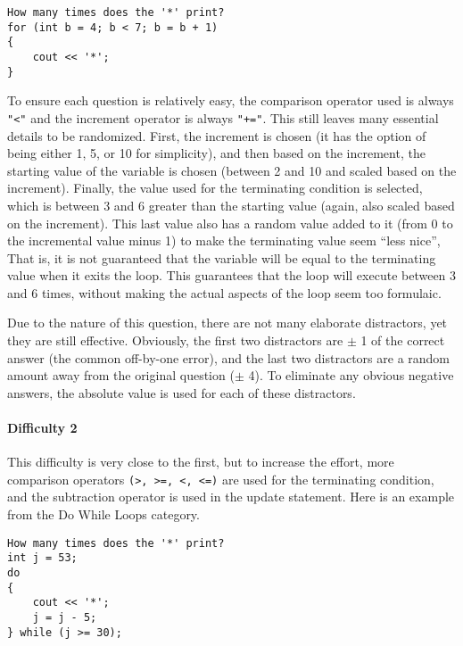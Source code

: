 \documentclass{article}
\begin{document}
\begin{lstlisting}
How many times does the '*' print? 
for (int b = 4; b < 7; b = b + 1)
{
	cout << '*';
} 
\end{lstlisting}

To ensure each question is relatively easy, the comparison operator used is always \verb;"<"; and the increment operator is always \verb;"+=";. This still leaves many essential details to be 
randomized. First, the increment is chosen (it has the option of being either 1, 5, or 10 for simplicity), and then based on the increment, the starting value of the variable is chosen (between 2 and 10 and scaled based on the increment). Finally, the value used for the terminating condition is selected, which is between 3 and 6 greater than the starting value (again, also scaled based 
on the increment). This last value also has a random value added to it (from 0 to the incremental value minus 1) to make the terminating value seem ``less nice'', That is, it is not guaranteed
that the variable will be equal to the terminating value when it exits the loop. This guarantees that the loop will execute between 3 and 6 times, without making the actual aspects of the loop 
seem too formulaic. 

Due to the nature of this question, there are not many elaborate distractors, yet they are still effective. Obviously, the first two distractors are $\pm$ 1 of the correct answer (the common 
off-by-one error), and the last two distractors are a random amount away from the original question ($\pm$ 4). To eliminate any obvious negative answers, the absolute value is used for each of these distractors. 

\paragraph{Difficulty 2} \hfill \par
This difficulty is very close to the first, but to increase the effort, more comparison operators \verb;(>, >=, <, <=); are used for the terminating condition, and the subtraction operator is used in the update
statement. Here is an example from the Do While Loops category.

\begin{lstlisting}
How many times does the '*' print? 
int j = 53;
do 
{
	cout << '*'; 
	j = j - 5; 
} while (j >= 30); 
\end{lstlisting}
\end{document}

